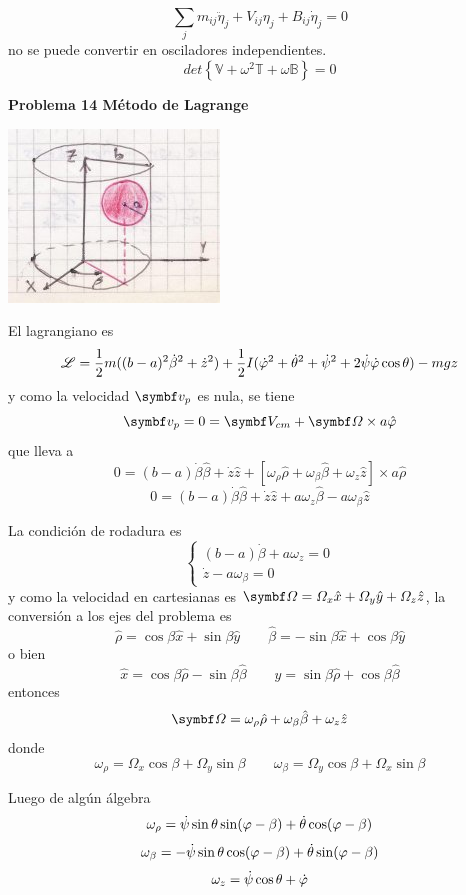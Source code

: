 \documentclass[10pt,oneside]{CBFT_book}
\begin{document}
\[
	\sum_j m_{ij} \ddot{\eta}_j + V_{ij}\eta_j + B_{ij}\dot{\eta}_j = 0
\]
no se puede convertir en osciladores independientes.
\[
	det\left\{ \mathbb{V} + \omega^2 \mathbb{T} + \omega \mathbb{B}\right\} = 0
\]


\begin{ejemplo}{\bf Problema 14 Método de Lagrange}

\includegraphics[scale=0.5]{images/fig_mc_lagrangebola_1.jpg}

El lagrangiano es
\[
	\mathscr{L} = \frac 1 2 m ( (b-a)^2 \dot{\beta}^2 + \dot{z}^2 ) + 
	\frac 1 2 I ( \dot{\varphi}^2 + \dot{\theta}^2 + \dot{\psi}^2 + 2 \dot{\psi} \dot{\varphi} \cos\theta ) 
	- m g z
\]
y como la velocidad $ \vb{v}_p $ es nula, se tiene 
\[
	\vb{v}_p = 0 = \vb{V}_{cm} + \vb{\Omega} \times a \hat{\vp}
\]
que lleva a
\[
	0 = (b-a)\dot{\beta}\hat{\beta} + \dot{z}\hat{z} +
	[\omega_\rho\hat{\rho} + \omega_\beta\hat{\beta} + \omega_z\hat{z} ]\times a\hat{\rho}
\]
\[
	0 = (b-a)\dot{\beta}\hat{\beta} + \dot{z}\hat{z} + a\omega_z\hat{\beta} - a\omega_\beta\hat{z} 
\]

La condición de rodadura es
\[
	\begin{cases}
	 (b-a)\dot{\beta} + a \omega_z = 0 \\
	 \dot{z} - a \omega_\beta = 0
	\end{cases}
\]
y como la velocidad en cartesianas es $ \vb{\Omega} = \Omega_x \hat{x} + \Omega_y \hat{y} + \Omega_z \hat{z} $,
la conversión a los ejes del problema es
\[
	\hat{\rho} = \cos \beta \hat{x} + \sin \beta \hat{y} \qquad 
	\hat{\beta} = -\sin \beta \hat{x} + \cos \beta \hat{y}
\]
o bien
\[
	\hat{x} = \cos \beta \hat{\rho} - \sin \beta \hat{\beta} \qquad 
	\hat{y} = \sin \beta \hat{\rho} + \cos \beta \hat{\beta}
\]
entonces
\[
	\vb{\Omega} = \omega_\rho \hat{\rho} + \omega_\beta \hat{\beta} + \omega_z \hat{z}
\]
donde 
\[
	\omega_\rho = \Omega_x \cos\beta + \Omega_y \sin\beta \qquad 
	\omega_\beta = \Omega_y \cos\beta + \Omega_x \sin\beta 
\]

Luego de algún álgebra
\[
	\omega_\rho = \dot{\psi} \sin\theta \sin(\varphi-\beta) + \dot{\theta} \cos(\varphi-\beta)
\]
\[
	\omega_\beta = -\dot{\psi} \sin\theta \cos(\varphi-\beta) + \dot{\theta} \sin(\varphi-\beta)
\]
\[
	\omega_z = \dot{\psi} \cos\theta + \dot{\varphi}
\]


\end{ejemplo}
\end{document}
